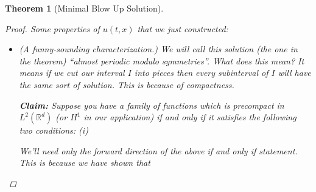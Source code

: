 \documentclass{article}
\newtheorem{theorem}{Theorem}
\def\R{\mathbb{R}} %
\begin{document}
\begin{theorem}[Minimal Blow Up Solution]
\begin{proof}
    Some properties of $u(t,x)$ that we just constructed:
    \begin{itemize}
      \item (A funny-sounding characterization.) We will call this solution (the
      one in the theorem) ``almost periodic modulo symmetries''. What does this
      mean? It means if we cut our interval $I$ into pieces then every
      subinterval of $I$ will have the same sort of solution. This is because of
      compactness.

      \textbf{Claim: }Suppose you have a family of functions which is precompact
      in $L^{2}(\R^d)$ (or $H^{1}$ in our application) if and only if it
      satisfies the following two conditions: (i)

      We'll need only the forward direction of the above if and only if
      statement. This is because we have shown that 
    \end{itemize}
    
    
  \end{proof}
\end{theorem}
\end{document}
